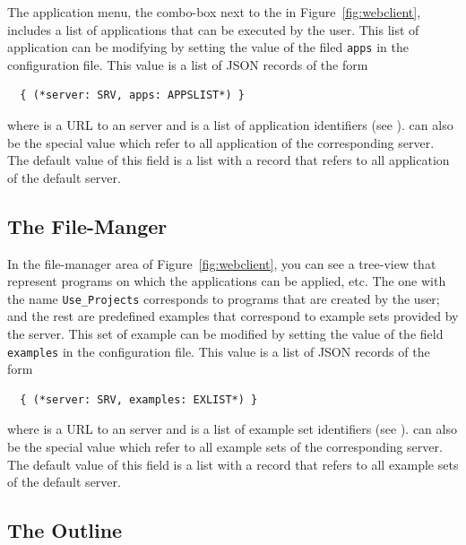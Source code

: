 The application menu, the combo-box next to the \applybutton in
Figure~\ref{fig:webclient}, includes a list of applications that can
be executed by the user. This list of application can be modifying by
setting the value of the filed \texttt{apps} in the configuration
file. This value is a list of JSON records of the form

\bigskip
\begin{lstlisting}
  { (*server: SRV, apps: APPSLIST*) }
\end{lstlisting}
 
\bigskip
\noindent  
where  is a URL to an \ei server and  is a list
of application identifiers (see ).
%
 can also be the special value  which refer to
all application of the corresponding server.
%
The default value of this field is a list with a record that refers to
all application of the default server.

\subsection{The File-Manger}
\label{ch:clients:web:filemanager}

In the file-manager area of Figure~\ref{fig:webclient}, you can see a
tree-view that represent programs on which the applications can be
applied, etc. The one with the name \texttt{Use\_Projects} corresponds
to programs that are created by the user; and the rest are predefined
examples that correspond to example sets provided by the server. This
set of example can be modified by setting the value of the field
\texttt{examples} in the configuration file.  This value is a list of
JSON records of the form

\bigskip
\begin{lstlisting}
  { (*server: SRV, examples: EXLIST*) } 
\end{lstlisting}

\bigskip
\noindent
where  is a URL to an \ei server and  is a list
of example set identifiers (see
).  can also be the special
value  which refer to all example sets of the corresponding
server. The default value of this field is a list with a record that
refers to all example sets of the default server.

\subsection{The Outline}
\label{ch:clients:web:outline}

